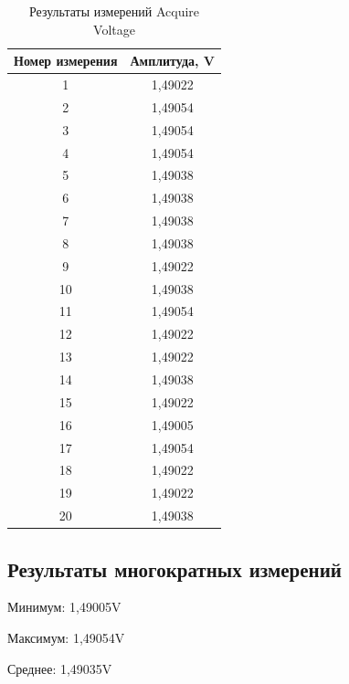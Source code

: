 \documentclass[a4paper,14pt]{article}
\begin{document}
\begin{table}[H]
	\centering
	\caption{Результаты измерений Acquire Voltage}
	\label{tab:av}
	\begin{tabular}{|c|c|}
		\hline
		Номер измерения & Амплитуда, V \\ \hline
		1               & 1,49022      \\ \hline
		2               & 1,49054      \\ \hline
		3               & 1,49054      \\ \hline
		4               & 1,49054      \\ \hline
		5               & 1,49038      \\ \hline
		6               & 1,49038      \\ \hline
		7               & 1,49038      \\ \hline
		8               & 1,49038      \\ \hline
		9               & 1,49022      \\ \hline
		10              & 1,49038      \\ \hline
		11              & 1,49054      \\ \hline
		12              & 1,49022      \\ \hline
		13              & 1,49022      \\ \hline
		14              & 1,49038      \\ \hline
		15              & 1,49022      \\ \hline
		16              & 1,49005      \\ \hline
		17              & 1,49054      \\ \hline
		18              & 1,49022      \\ \hline
		19              & 1,49022      \\ \hline
		20              & 1,49038      \\ \hline
	\end{tabular}
\end{table}

\subsection{Результаты многократных измерений}

Минимум: 1,49005V

Максимум: 1,49054V

Среднее: 1,49035V
\end{document}
